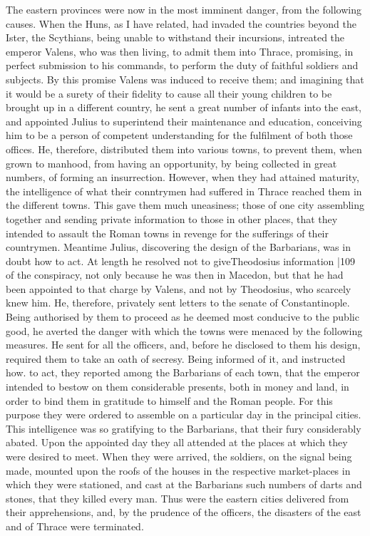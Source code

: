 The eastern provinces were now in the most imminent danger, from the following causes. When the Huns, as I have related, had invaded the countries beyond the Ister, the Scythians, being unable to withstand their incursions, intreated the emperor Valens, who was then living, to admit them into Thrace, promising, in perfect submission to his commands, to perform the duty of faithful soldiers and subjects. By this promise Valens was induced to receive them; and imagining that it would be a surety of their fidelity to cause all their young children to be brought up in a different country, he sent a great number of infants into the east, and appointed Julius to superintend their maintenance and education, conceiving him to be a person of competent understanding for the fulfilment of both those offices. He, therefore, distributed them into various towns, to prevent them, when grown to manhood, from having an opportunity, by being collected in great numbers, of forming an insurrection. However, when they had attained maturity, the intelligence of what their conntrymen had suffered in Thrace reached them in the different towns. This gave them much uneasiness; those of one city assembling together and sending private information to those in other places, that they intended to assault the Roman towns in revenge for the sufferings of their countrymen. Meantime Julius, discovering the design of the Barbarians, was in doubt how to act. At length he resolved not to give\emph{}Theodosius information
|109
of the conspiracy, not only because he was then in Macedon, but that he had been appointed to that charge by Valens, and not by Theodosius, who scarcely knew him. He, therefore, privately sent letters to the senate of Constantinople. Being authorised by them to proceed as he deemed most conducive to the public good, he averted the danger with which the towns were menaced by the following measures. He sent for all the officers, and, before he disclosed to them his design, required them to take an oath of secresy. Being informed of it, and instructed how. to act, they reported among the Barbarians of each town, that the emperor intended to bestow on them considerable presents, both in money and land, in order to bind them in gratitude to himself and the Roman people. For this purpose they were ordered to assemble on a particular day in the principal cities. This intelligence was so gratifying to the Barbarians, that their fury considerably abated. Upon the appointed day they all attended at the places at which they were desired to meet. When they were arrived, the soldiers, on the signal being made, mounted upon the roofs of the houses in the respective market-places in which they were stationed, and cast at the Barbarians such numbers of darts and stones, that they killed every man. Thus were the eastern cities delivered from their apprehensions, and, by the prudence of the officers, the disasters of the east and of Thrace were terminated.

